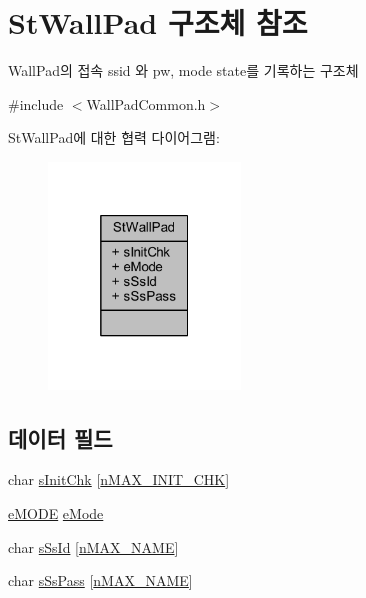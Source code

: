 \hypertarget{struct_st_wall_pad}{}\section{St\+Wall\+Pad 구조체 참조}
\label{struct_st_wall_pad}


Wall\+Pad의 접속 ssid 와 pw, mode state를 기록하는 구조체  




{\ttfamily \#include $<$Wall\+Pad\+Common.\+h$>$}



St\+Wall\+Pad에 대한 협력 다이어그램\+:\nopagebreak
\begin{figure}[H]
\begin{center}
\leavevmode
\includegraphics[width=145pt]{struct_st_wall_pad__coll__graph}
\end{center}
\end{figure}
\subsection*{데이터 필드}
\begin{DoxyCompactItemize}
\item 
char \mbox{\hyperlink{struct_st_wall_pad_afa1dc1e2339538ae37ff115251ce1187}{s\+Init\+Chk}} \mbox{[}\mbox{\hyperlink{_wall_pad_common_8h_a633363122e0b4c2005649a1664a2335a}{n\+M\+A\+X\+\_\+\+I\+N\+I\+T\+\_\+\+C\+HK}}\mbox{]}
\item 
\mbox{\hyperlink{_wall_pad_common_8h_a066235770a533eb740dc3fd2494d64da}{e\+M\+O\+DE}} \mbox{\hyperlink{struct_st_wall_pad_a51f947b3c4ad6a33d096bfaf1caedb6e}{e\+Mode}}
\item 
char \mbox{\hyperlink{struct_st_wall_pad_afb1618185a1aecb8c77eff2f1453c24f}{s\+Ss\+Id}} \mbox{[}\mbox{\hyperlink{_wall_pad_common_8h_aa1bfef2ce53d431c709ee094aa02ccb6}{n\+M\+A\+X\+\_\+\+N\+A\+ME}}\mbox{]}
\item 
char \mbox{\hyperlink{struct_st_wall_pad_a8c77e9b61d65201646350d01f8a8d7c0}{s\+Ss\+Pass}} \mbox{[}\mbox{\hyperlink{_wall_pad_common_8h_aa1bfef2ce53d431c709ee094aa02ccb6}{n\+M\+A\+X\+\_\+\+N\+A\+ME}}\mbox{]}
\end{DoxyCompactItemize}


